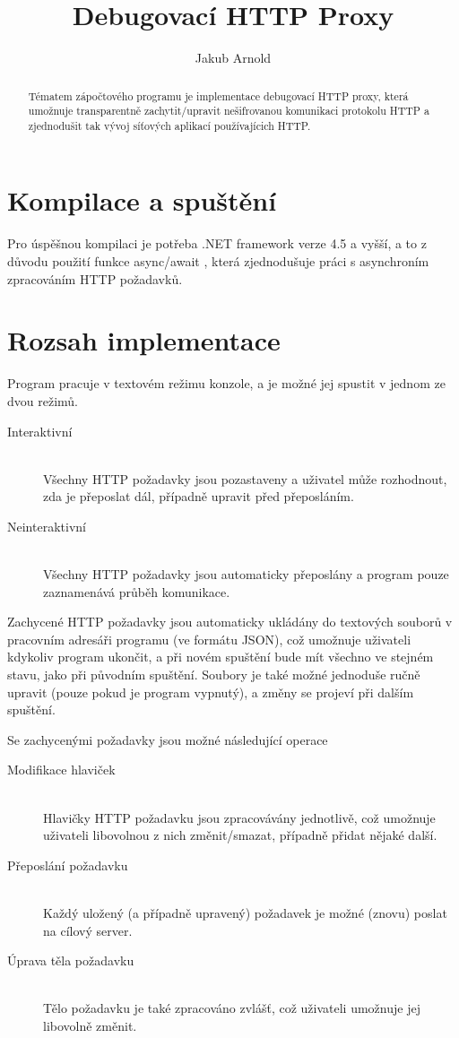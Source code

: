 \documentclass{article}
\title{Debugovací HTTP Proxy}
\author{Jakub Arnold}
\date{}
\begin{document}
\maketitle

\begin{abstract}
	Tématem zápočtového programu je implementace debugovací HTTP proxy, která umožnuje transparentně
	zachytit/upravit nešifrovanou komunikaci protokolu HTTP a zjednodušit tak vývoj síťových aplikací používajícich HTTP.
\end{abstract}

\section{Kompilace a spuštění}

Pro úspěšnou kompilaci je potřeba .NET framework verze 4.5 a vyšší, a to z důvodu použití funkce async/await \cite{async}, která zjednodušuje práci s asynchroním zpracováním HTTP požadavků.

\section{Rozsah implementace}

Program pracuje v textovém režimu konzole, a je možné jej spustit v jednom ze dvou režimů.

\begin{description}
	\item[Interaktivní] \hfill \\
		Všechny HTTP požadavky jsou pozastaveny a uživatel může rozhodnout, zda je přeposlat dál, případně upravit před přeposláním.
	\item[Neinteraktivní] \hfill \\
		Všechny HTTP požadavky jsou automaticky přeposlány a program pouze zaznamenává průběh komunikace.
\end{description}

Zachycené HTTP požadavky jsou automaticky ukládány do textových souborů v pracovním adresáři programu (ve formátu JSON), což umožnuje uživateli kdykoliv program ukončit, a při novém spuštění bude mít všechno ve stejném stavu, jako při původním spuštění. Soubory je také možné jednoduše ručně upravit (pouze pokud je program vypnutý), a změny se projeví při dalším spuštění.

Se zachycenými požadavky jsou možné následující operace

\begin{description}
	\item[Modifikace hlaviček] \hfill \\
		Hlavičky HTTP požadavku jsou zpracovávány jednotlivě, což umožnuje uživateli libovolnou z nich změnit/smazat, případně přidat nějaké další.
	\item[Přeposlání požadavku] \hfill \\
		Každý uložený (a případně upravený) požadavek je možné (znovu) poslat na cílový server.
	\item[Úprava těla požadavku] \hfill \\
		Tělo požadavku je také zpracováno zvlášť, což uživateli umožnuje jej libovolně změnit.
\end{description}
\end{document}
